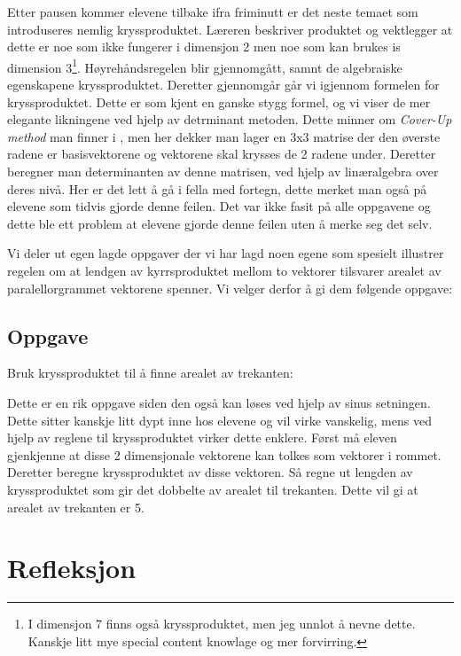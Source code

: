 \documentclass[11pt]{article}
\begin{document}
Etter pausen kommer elevene tilbake ifra friminutt er det neste temaet som introduseres nemlig kryssproduktet. Læreren beskriver produktet og vektlegger at dette er noe som ikke fungerer i dimensjon 2 men noe som kan brukes is dimension 3\footnote{I dimensjon 7 finns også kryssproduktet, men jeg unnlot å nevne dette. Kanskje litt mye special content knowlage og mer forvirring.}. Høyrehåndsregelen blir gjennomgått, samnt de algebraiske egenskapene kryssproduktet. Deretter gjennomgår går vi igjennom formelen for kryssproduktet. Dette er som kjent en ganske stygg formel, og vi viser  de mer elegante likningene ved hjelp av detrminant metoden. Dette minner om \emph{Cover-Up method} man finner i \citep[side 273]{addup2}, men  her dekker man lager en 3x3 matrise der den øverste radene er basisvektorene  og vektorene skal krysses de 2 radene under. Deretter beregner man determinanten av denne matrisen, ved hjelp av linæralgebra over deres nivå. Her er det lett å gå i fella med fortegn, dette merket man også på elevene som tidvis gjorde denne feilen. Det var ikke fasit på alle oppgavene og dette ble ett problem at elevene gjorde denne feilen uten å merke seg det selv.




Vi deler ut egen lagde oppgaver der vi har lagd noen egene som spesielt illustrer regelen om at lendgen av kyrrsproduktet mellom to vektorer tilsvarer arealet av paralellorgrammet vektorene spenner. Vi velger derfor å gi dem følgende oppgave:
\subsection*{Oppgave}

Bruk kryssproduktet til å finne arealet av trekanten:  

\begin{center}
\end{center}


Dette er en rik oppgave \citep{rike} siden den også kan løses ved hjelp av sinus setningen. Dette sitter kanskje litt dypt inne hos elevene og vil virke vanskelig, mens ved hjelp av reglene til kryssproduktet virker dette enklere. Først må eleven gjenkjenne at disse 2 dimensjonale vektorene kan tolkes som vektorer i rommet. Deretter beregne kryssproduktet av disse vektoren. Så regne ut lengden av kryssproduktet som gir det dobbelte av arealet til trekanten. Dette vil gi at  arealet av trekanten er 5.  



\section{Refleksjon}


\label{sec-4}
\newpage

\end{document}
